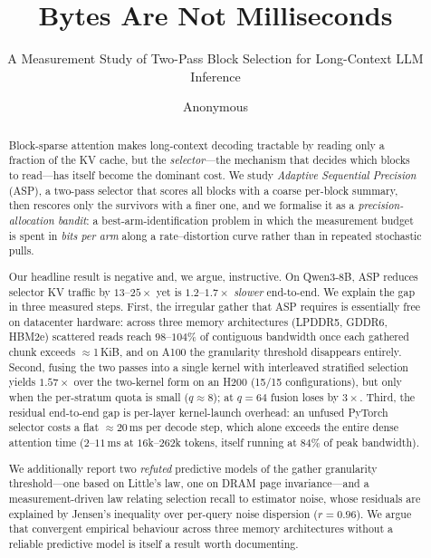 \documentclass[sigconf,nonacm,11pt]{acmart}
\begin{document}
\title{Bytes Are Not Milliseconds}
\subtitle{A Measurement Study of Two-Pass Block Selection for Long-Context LLM Inference}

\author{Anonymous}
\affiliation{\institution{}\country{}}

\begin{abstract}
Block-sparse attention makes long-context decoding tractable by reading only a
fraction of the KV cache, but the \emph{selector}---the mechanism that decides
which blocks to read---has itself become the dominant cost. We study
\emph{Adaptive Sequential Precision} (ASP), a two-pass selector that scores all
blocks with a coarse per-block summary, then rescores only the survivors with a
finer one, and we formalise it as a \emph{precision-allocation bandit}: a
best-arm-identification problem in which the measurement budget is spent in
\emph{bits per arm} along a rate--distortion curve rather than in repeated
stochastic pulls.

Our headline result is negative and, we argue, instructive. On Qwen3-8B, ASP
reduces selector KV traffic by $13\text{--}25\times$ yet is $1.2\text{--}1.7\times$
\emph{slower} end-to-end. We explain the gap in three measured steps. First, the
irregular gather that ASP requires is essentially free on datacenter hardware:
across three memory architectures (LPDDR5, GDDR6, HBM2e) scattered reads reach
$98\text{--}104\%$ of contiguous bandwidth once each gathered chunk exceeds
$\approx$1\,KiB, and on A100 the granularity threshold disappears entirely.
Second, fusing the two passes into a single kernel with interleaved stratified
selection yields $1.57\times$ over the two-kernel form on an H200 (15/15
configurations), but only when the per-stratum quota is small ($q\!\approx\!8$);
at $q=64$ fusion loses by $3\times$. Third, the residual end-to-end gap is
per-layer kernel-launch overhead: an unfused PyTorch selector costs a flat
$\approx$20\,ms per decode step, which alone exceeds the entire dense attention
time ($2\text{--}11$\,ms at $16$k--$262$k tokens, itself running at $84\%$ of
peak bandwidth).

We additionally report two \emph{refuted} predictive models of the gather
granularity threshold---one based on Little's law, one on DRAM page
invariance---and a measurement-driven law relating selection recall to
estimator noise, whose residuals are explained by Jensen's inequality over
per-query noise dispersion ($r=0.96$). We argue that convergent empirical
behaviour across three memory architectures without a reliable predictive model is itself a
result worth documenting.
\end{abstract}
\end{document}
